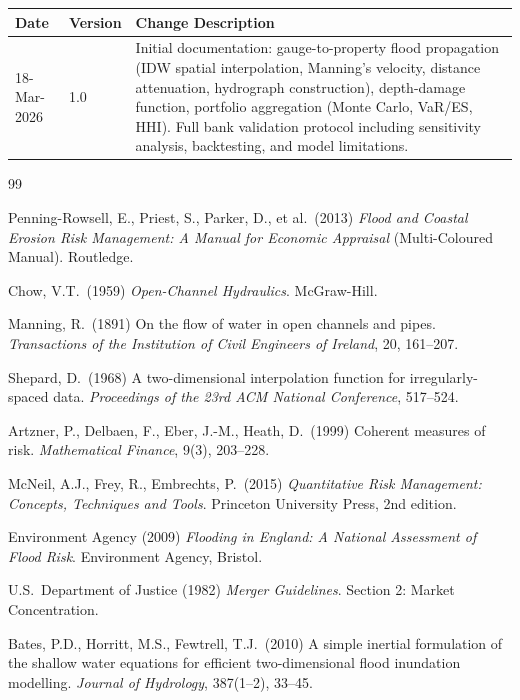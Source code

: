 \documentclass[11pt,a4paper]{article}
\begin{document}
\clearpage

\mkmchangelog

\begin{longtable}{l|l|p{10cm}}
    \toprule
    \textbf{Date} & \textbf{Version} & \textbf{Change Description} \\
    \midrule
    \endhead
    18-Mar-2026 & 1.0 & Initial documentation: gauge-to-property flood propagation
    (IDW spatial interpolation, Manning's velocity, distance attenuation, hydrograph
    construction), depth-damage function, portfolio aggregation (Monte Carlo, VaR/ES,
    HHI). Full bank validation protocol including sensitivity analysis, backtesting,
    and model limitations. \\
    \bottomrule
\end{longtable}


\clearpage
\begin{thebibliography}{99}

 Penning-Rowsell, E., Priest, S., Parker, D., et al.\ (2013)
    \textit{Flood and Coastal Erosion Risk Management: A Manual for Economic Appraisal}
    (Multi-Coloured Manual). Routledge.

 Chow, V.T.\ (1959)
    \textit{Open-Channel Hydraulics}. McGraw-Hill.

 Manning, R.\ (1891)
    On the flow of water in open channels and pipes.
    \textit{Transactions of the Institution of Civil Engineers of Ireland}, 20, 161--207.

 Shepard, D.\ (1968)
    A two-dimensional interpolation function for irregularly-spaced data.
    \textit{Proceedings of the 23rd ACM National Conference}, 517--524.

 Artzner, P., Delbaen, F., Eber, J.-M., Heath, D.\ (1999)
    Coherent measures of risk. \textit{Mathematical Finance}, 9(3), 203--228.

 McNeil, A.J., Frey, R., Embrechts, P.\ (2015)
    \textit{Quantitative Risk Management: Concepts, Techniques and Tools}.
    Princeton University Press, 2nd edition.

 Environment Agency (2009)
    \textit{Flooding in England: A National Assessment of Flood Risk}.
    Environment Agency, Bristol.

 U.S.\ Department of Justice (1982)
    \textit{Merger Guidelines}. Section 2: Market Concentration.

 Bates, P.D., Horritt, M.S., Fewtrell, T.J.\ (2010)
    A simple inertial formulation of the shallow water equations for efficient
    two-dimensional flood inundation modelling.
    \textit{Journal of Hydrology}, 387(1--2), 33--45.

\end{thebibliography}
\end{document}
